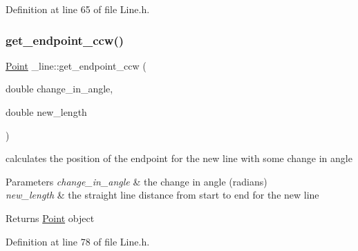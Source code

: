 Definition at line 65 of file Line.\+h.


\begin{DoxyCode}{0}

\end{DoxyCode}
\mbox{\label{struct__line_a3bb1fb1d6a0577adc3093e37929fd2a9}} 
\subsubsection{\texorpdfstring{get\_endpoint\_ccw()}{get\_endpoint\_ccw()}}
{\footnotesize\ttfamily \mbox{\hyperlink{struct_point}{Point}} \+\_\+line\+::get\+\_\+endpoint\+\_\+ccw (\begin{DoxyParamCaption}\item[{double}]{change\+\_\+in\+\_\+angle,  }\item[{double}]{new\+\_\+length }\end{DoxyParamCaption})\hspace{0.3cm}{\ttfamily [inline]}}



calculates the position of the endpoint for the new line with some change in angle 


\begin{DoxyParams}{Parameters}
{\em change\+\_\+in\+\_\+angle} & the change in angle (radians) \\
\hline
{\em new\+\_\+length} & the straight line distance from start to end for the new line \\
\hline
\end{DoxyParams}
\begin{DoxyReturn}{Returns}
\mbox{\hyperlink{struct_point}{Point}} object 
\end{DoxyReturn}


Definition at line 78 of file Line.\+h.


